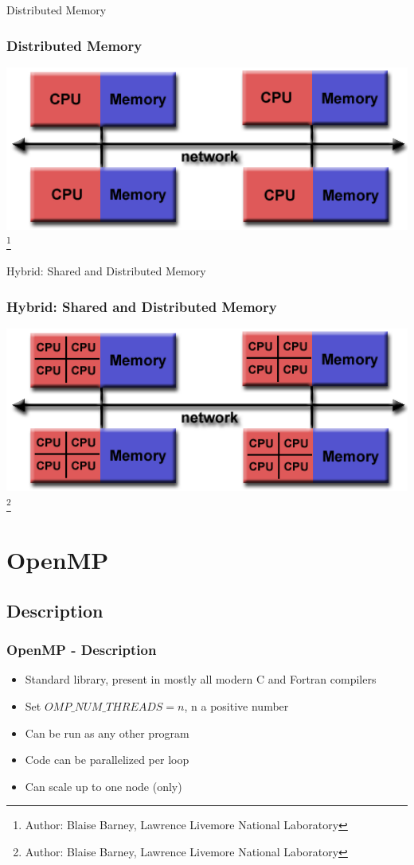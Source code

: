 \documentclass[hyperref={pdfpagelabels=false}]{beamer}
\newcommand\blfootnote[1]{%
   \begingroup
   \renewcommand\thefootnote{}\footnote{#1}%
   \addtocounter{footnote}{-1}%
   \endgroup
}
\begin{document}
    \begin{frame}{Distributed Memory}
        \frametitle{Distributed Memory}
        \begin{center}
            \includegraphics[scale=0.4]{images/distributed_memory.png}
            \blfootnote{\tiny{Author: Blaise Barney, Lawrence Livemore National Laboratory}}
        \end{center}
    \end{frame}
    
    \begin{frame}{Hybrid: Shared and Distributed Memory}
        \frametitle{Hybrid: Shared and Distributed Memory}
        \begin{center}
            \includegraphics[scale=0.4]{images/hybrid.png}
            \blfootnote{\tiny{Author: Blaise Barney, Lawrence Livemore National Laboratory}}
        \end{center}
    \end{frame}

    \section{OpenMP} 
    \subsection{Description}
    \begin{frame}
        \frametitle{OpenMP - Description}
        \begin{itemize}
            \item Standard library, present in mostly all modern C and Fortran compilers 
            \item Set $OMP\_NUM\_THREADS=n$, n a positive number
            \item Can be run as any other program
            \item Code can be parallelized per loop
            \item Can scale up to one node (only)  
        \end{itemize} 
    \end{frame}
\end{document}
